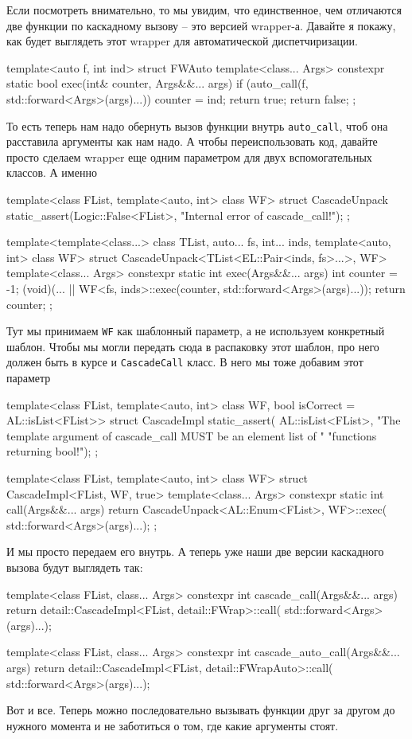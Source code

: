 Если посмотреть внимательно, то мы увидим, что единственное, чем отличаются две функции по каскадному вызову -- это версией wrapper-а.
Давайте я покажу, как будет выглядеть этот wrapper для автоматической диспетчиризации.
\begin{cppcode}
template<auto f, int ind>
struct FWAuto {
  template<class... Args>
  constexpr static bool exec(int& counter, Args&&... args) {
    if (auto_call(f, std::forward<Args>(args)...)) {
      counter = ind;
      return true;
    }
    return false;
  }
};
\end{cppcode}
То есть теперь нам надо обернуть вызов функции внутрь \verb"auto_call", чтоб она расставила аргументы как нам надо.
А чтобы переиспользовать код, давайте просто сделаем wrapper еще одним параметром для двух вспомогательных классов.
А именно
\begin{cppcode}
template<class FList, template<auto, int> class WF>
struct CascadeUnpack {
  static_assert(Logic::False<FList>, "Internal error of cascade_call!");
};

template<template<class...> class TList, auto... fs, int... inds,
         template<auto, int> class WF>
struct CascadeUnpack<TList<EL::Pair<inds, fs>...>, WF> {
  template<class... Args>
  constexpr static int exec(Args&&... args) {
    int counter = -1;
    (void)(... || WF<fs, inds>::exec(counter, std::forward<Args>(args)...));
    return counter;
  }
};
\end{cppcode}
Тут мы принимаем \verb"WF" как шаблонный параметр, а не используем конкретный шаблон.
Чтобы мы могли передать сюда в распаковку этот шаблон, про него должен быть в курсе и \verb"CascadeCall" класс.
В него мы тоже добавим этот параметр
\begin{cppcode}
template<class FList, template<auto, int> class WF,
         bool isCorrect = AL::isList<FList>>
struct CascadeImpl {
  static_assert(
      AL::isList<FList>,
      "The template argument of cascade_call MUST be an element list of "
      "functions returning bool!");
};

template<class FList, template<auto, int> class WF>
struct CascadeImpl<FList, WF, true> {
  template<class... Args>
  constexpr static int call(Args&&... args) {
    return CascadeUnpack<AL::Enum<FList>, WF>::exec(
        std::forward<Args>(args)...);
  }
};
\end{cppcode}
И мы просто передаем его внутрь.
А теперь уже наши две версии каскадного вызова будут выглядеть так:
\begin{cppcode}
template<class FList, class... Args>
constexpr int cascade_call(Args&&... args) {
  return detail::CascadeImpl<FList, detail::FWrap>::call(
      std::forward<Args>(args)...);
}

template<class FList, class... Args>
constexpr int cascade_auto_call(Args&&... args) {
  return detail::CascadeImpl<FList, detail::FWrapAuto>::call(
      std::forward<Args>(args)...);
}
\end{cppcode}
Вот и все.
Теперь можно последовательно вызывать функции друг за другом до нужного момента и не заботиться о том, где какие аргументы стоят.
